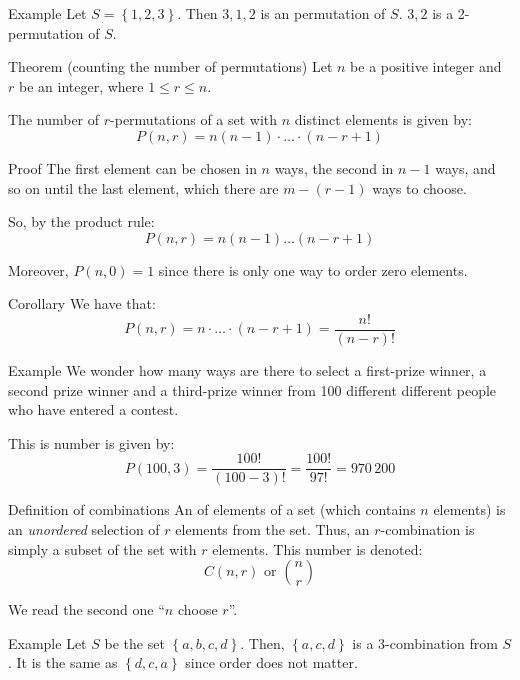 \documentclass[a4paper]{article}
\begin{document}
\begin{parag}{Example}
    Let $S = \left\{1, 2, 3\right\}$. Then $3, 1, 2$ is an permutation of $S$. $3, 2$ is a 2-permutation of $S$.
\end{parag}

\begin{parag}{Theorem (counting the number of permutations)}
    Let $n$ be a positive integer and $r$ be an integer, where $1 \leq r \leq n$.

    The number of $r$-permutations of a set with $n$ distinct elements is given by: 
    \[P\left(n, r\right) = n\left(n-1\right)\cdot\ldots\cdot\left(n - r + 1\right)\]
    
    \begin{subparag}{Proof}
        The first element can be chosen in $n$ ways, the second in $n-1$ ways, and so on until the last element, which there are $m - \left(r - 1\right)$ ways to choose.

        So, by the product rule: 
        \[P\left(n, r\right) = n\left(n-1\right)\ldots\left(n-r+1\right)\]

        Moreover, $P\left(n, 0\right) = 1$ since there is only one way to order zero elements.
    \end{subparag}

    \begin{subparag}{Corollary}
        We have that: 
        \[P\left(n, r\right) =  n\cdot\ldots\cdot\left(n - r + 1\right) = \frac{n!}{\left(n - r\right)!}\]
        
    \end{subparag}
    
    
\end{parag}

\begin{parag}{Example}
    We wonder how many ways are there to select a first-prize winner, a second prize winner and a third-prize winner from 100 different different people who have entered a contest. 

    This is number is given by: 
    \[P\left(100, 3\right) = \frac{100!}{\left(100 - 3\right)!} = \frac{100!}{97!} = 970\,200\]
    
\end{parag}

\begin{parag}{Definition of combinations}
    An  of elements of a set (which contains $n$ elements) is an \textit{unordered} selection of $r$ elements from the set. Thus, an $r$-combination is simply a subset of the set with $r$ elements. This number is denoted: 
    \[C\left(n, r\right) \text{ or } \binom{n}{r}\]
    
    We read the second one ``$n$ choose $r$''.
\end{parag}

\begin{parag}{Example}
    Let $S$ be the set $\left\{a, b, c, d\right\}$. Then, $\left\{a, c, d\right\}$ is a 3-combination from $S$. It is the same as $\left\{d, c, a\right\}$ since order does not matter.
\end{parag}
\end{document}
